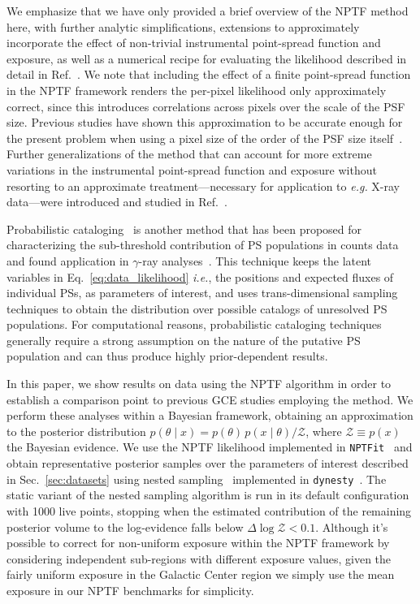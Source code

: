 \documentclass[prd,aps,10pt,nofootinbib,twocolumn,superscriptaddress,preprintnumbers,balancelastpage,longbibliography]{revtex4-1}
\begin{document}
We emphasize that we have only provided a brief overview of the NPTF method here, with further analytic simplifications, extensions to approximately incorporate the effect of non-trivial instrumental point-spread function and exposure, as well as a numerical recipe for evaluating the likelihood described in detail in Ref.~\cite{Mishra-Sharma:2016gis}. We note that including the effect of a finite point-spread function in the NPTF framework renders the per-pixel likelihood only approximately correct, since this introduces correlations across pixels over the scale of the PSF size. Previous studies have shown this approximation to be accurate enough for the present problem when using a pixel size of the order of the PSF size itself~\cite{Chang:2019ars}. Further generalizations of the method that can account for more extreme variations in the instrumental point-spread function and exposure without resorting to an approximate treatment---necessary for application to \emph{e.g.} X-ray data---were introduced and studied in Ref.~\cite{Collin:2021ufc}. 

Probabilistic cataloging~\cite{2013AJ....146....7B,2021arXiv210202409L} is another method that has been proposed for characterizing the sub-threshold contribution of PS populations in counts data and found application in $\gamma$-ray analyses~\cite{Daylan:2016tia}. This technique keeps the latent variables in Eq.~\eqref{eq:data_likelihood} \emph{i.e.}, the positions and expected fluxes of individual PSs, as parameters of interest, and uses trans-dimensional sampling techniques to obtain the distribution over possible catalogs of unresolved PS populations. For computational reasons, probabilistic cataloging techniques generally require a strong assumption on the nature of the putative PS population and can thus produce highly prior-dependent results.

In this paper, we show results on \Fermi data using the NPTF algorithm in order to establish a comparison point to previous GCE studies employing the method. We perform these analyses within a Bayesian framework, obtaining an approximation to the posterior distribution $p(\theta\mid x) = p(\theta)\, p(x\mid\theta) / \mathcal Z$, where $\mathcal Z \equiv p(x)$ the Bayesian evidence. 
We use the NPTF likelihood implemented in \texttt{NPTFit}~\cite{Mishra-Sharma:2016gis} and obtain representative posterior samples over the parameters of interest described in Sec.~\ref{sec:datasets} using nested sampling~\cite{Feroz:2013hea,skilling2006} implemented in \texttt{dynesty}~\cite{Speagle_2020}. The static variant of the nested sampling algorithm is run in its default configuration with 1000 live points, stopping when the estimated contribution of the remaining posterior volume to the log-evidence falls below $\Delta \log \mathcal Z < 0.1$. Although it's possible to correct for non-uniform exposure within the NPTF framework by considering independent sub-regions with different exposure values, given the fairly uniform \Fermi exposure in the Galactic Center region we simply use the mean exposure in our NPTF benchmarks for simplicity.
\end{document}
